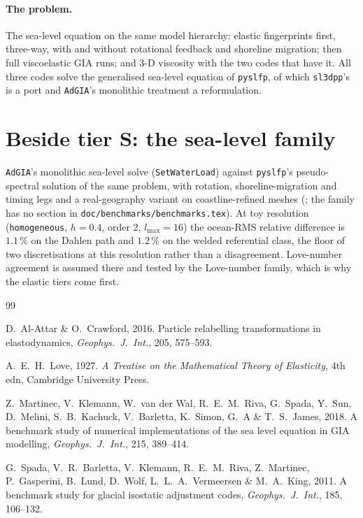 \documentclass[11pt]{article}
\numberwithin{equation}{section}
\newcommand{\code}[1]{\texttt{#1}}
\begin{document}
\paragraph{The problem.} The sea-level equation on the same model
hierarchy: elastic fingerprints first, three-way, with and without
rotational feedback and shoreline migration; then full viscoelastic GIA
runs; and 3-D viscosity with the two codes that have it. All three codes
solve the generalised sea-level equation of \code{pyslfp}, of which
\code{sl3dpp}'s is a port and \code{AdGIA}'s monolithic treatment a
reformulation.

\section{Beside tier S: the sea-level family}
\label{sec:internal-sea}

\code{AdGIA}'s monolithic sea-level solve (\code{SetWaterLoad}) against
\code{pyslfp}'s pseudo-spectral solution of the same problem, with
rotation, shoreline-migration and timing legs and a real-geography variant
on coastline-refined meshes (; the
family has no section in \code{doc/benchmarks/benchmarks.tex}). At toy resolution
(\code{homogeneous}, $h=0.4$, order 2, $l_{\max}=16$) the ocean-RMS
relative difference is $1.1\,\%$ on the Dahlen path and $1.2\,\%$ on the
welded referential class, the floor of two discretisations at this
resolution rather than a disagreement. Love-number agreement is assumed there and tested by
the Love-number family, which is why the elastic tiers come first.

\begin{thebibliography}{99}

D.~Al-Attar \& O.~Crawford, 2016.
Particle relabelling transformations in elastodynamics,
\emph{Geophys.\ J.\ Int.}, 205, 575--593.

A.~E.~H.~Love, 1927.
\emph{A Treatise on the Mathematical Theory of Elasticity}, 4th edn,
Cambridge University Press.

Z.~Martinec, V.~Klemann, W.~van der Wal, R.~E.~M.~Riva, G.~Spada, Y.~Sun,
D.~Melini, S.~B.~Kachuck, V.~Barletta, K.~Simon, G.~A \& T.~S.~James, 2018.
A benchmark study of numerical implementations of the sea level equation in
GIA modelling, \emph{Geophys.\ J.\ Int.}, 215, 389--414.

G.~Spada, V.~R.~Barletta, V.~Klemann, R.~E.~M.~Riva, Z.~Martinec,
P.~Gasperini, B.~Lund, D.~Wolf, L.~L.~A.~Vermeersen \& M.~A.~King, 2011.
A benchmark study for glacial isostatic adjustment codes,
\emph{Geophys.\ J.\ Int.}, 185, 106--132.

\end{thebibliography}
\end{document}
